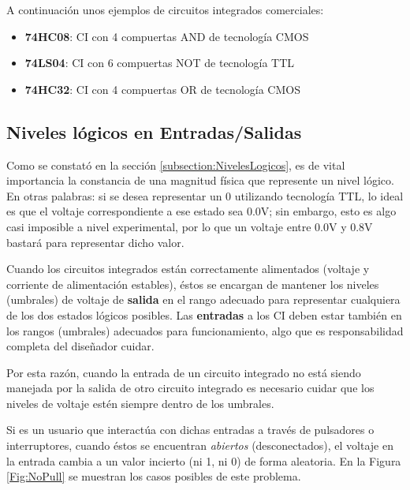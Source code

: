 \vspace{20pt}
A continuación unos ejemplos de circuitos integrados comerciales:

\begin{itemize}
    \item \textbf{74HC08}: CI con 4 compuertas AND de tecnología CMOS
    \item \textbf{74LS04}: CI con 6 compuertas NOT de tecnología TTL
    \item \textbf{74HC32}: CI con 4 compuertas OR de tecnología CMOS
\end{itemize}


\subsection{Niveles lógicos en Entradas/Salidas}
Como se constató en la sección \ref{subsection:NivelesLogicos}, es de vital importancia la constancia de una magnitud física que represente un nivel lógico.
En otras palabras: si se desea representar un $0$ utilizando tecnología TTL, lo ideal es que el voltaje correspondiente a ese estado sea 0.0V; sin embargo, esto
es algo casi imposible a nivel experimental, por lo que un voltaje entre 0.0V y 0.8V bastará para representar dicho valor.

Cuando los circuitos integrados están correctamente alimentados (voltaje y corriente de alimentación estables), éstos se encargan de mantener los niveles (umbrales) de voltaje de \textbf{salida} en el rango adecuado para representar
cualquiera de los dos estados lógicos posibles. Las \textbf{entradas} a los CI deben estar también en los rangos (umbrales) adecuados para funcionamiento, algo que es responsabilidad completa del diseñador cuidar.

Por esta razón, cuando la entrada de un circuito integrado no está siendo manejada por la salida de otro circuito integrado es necesario cuidar que los niveles de voltaje estén siempre dentro de los umbrales.

Si es un usuario que interactúa con dichas entradas a través de pulsadores o interruptores, cuando éstos se encuentran \emph{abiertos} (desconectados), el voltaje en la entrada cambia a un valor incierto (ni 1, ni 0)
de forma aleatoria. En la Figura \ref{Fig:NoPull} se muestran los casos posibles de este problema.

